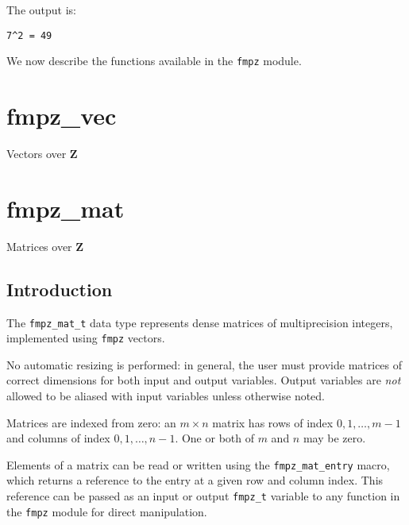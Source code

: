 \documentclass[a4paper,10pt]{book}
\newcommand{\Z}{\mathbf{Z}}%
\newcommand{\code}{\lstinline}
\begin{document}
The output is:
\begin{lstlisting}
7^2 = 49
\end{lstlisting}

We now describe the functions available in the \code{fmpz} module.




\chapter{fmpz\_vec}
\epigraph{Vectors over $\Z$}{}




\chapter{fmpz\_mat}
\epigraph{Matrices over $\Z$}{}

\section{Introduction}

The \code{fmpz_mat_t} data type represents dense matrices of multiprecision
integers, implemented using \code{fmpz} vectors.

No automatic resizing is performed: in general, the user must provide
matrices of correct dimensions for both input and output variables. Output
variables are \emph{not} allowed to be aliased with input variables unless
otherwise noted.

Matrices are indexed from zero: an $m \times n$ matrix
has rows of index $0,1,\ldots,m-1$ and columns of
index $0,1,\ldots,n-1$. One or both of $m$ and $n$ may be zero.

Elements of a matrix can be read or written using the \code{fmpz_mat_entry}
macro, which returns a reference to the entry at a given row and column index.
This reference can be passed as an input or output \code{fmpz_t} variable to 
any function in the \code{fmpz} module for direct manipulation.
\end{document}
